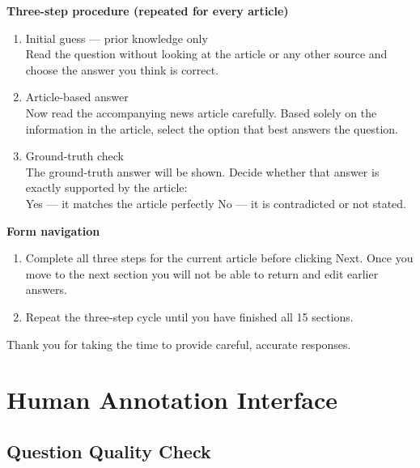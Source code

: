 \documentclass[11pt]{article}
\newcommand{\draft}[1]{#1}
\newcommand{\jz}[1]{\textcolor{blue}{\draft{[#1]}}}
\begin{document}
\textbf{Three-step procedure (repeated for every article)}

\begin{enumerate}
    \item Initial guess — prior knowledge only\\
    Read the question without looking at the article or any other source and choose the answer you think is correct.

    \item Article-based answer\\
    Now read the accompanying news article carefully. Based solely on the information in the article, select the option that best answers the question.

    \item Ground-truth check\\
    The ground-truth answer will be shown. Decide whether that answer is exactly supported by the article:\\
    Yes — it matches the article perfectly \textbar{} No — it is contradicted or not stated.
\end{enumerate}

\textbf{Form navigation}

\begin{enumerate}
    \item Complete all three steps for the current article before clicking Next. Once you move to the next section you will not be able to return and edit earlier answers.

    \item Repeat the three-step cycle until you have finished all 15 sections.
\end{enumerate}

Thank you for taking the time to provide careful, accurate responses.




\clearpage
\section{Human Annotation Interface}
\label{sec:human-annotation-interface}


\subsection{Question Quality Check}
\end{document}
